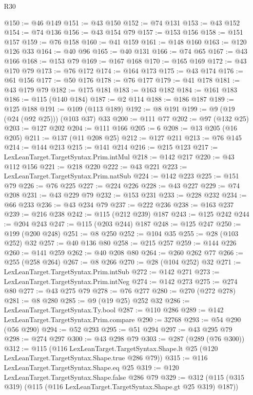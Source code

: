 \begin{lexlean}{R30}
\begin{coremodule}
@150 := @46 @149
@151 := @43 @150
@152 := @74 @131
@153 := @43 @152
@154 := @74 @136
@156 := @43 @154 @79
@157 := @153 @156
@158 := @151 @157
@159 := @76 @158
@160 := @41 @159
@161 := @148 @160
@163 := @120 @126 @33
@164 := @40 @96
@165 := @40 @131
@166 := @74 @65
@167 := @43 @166
@168 := @153 @79
@169 := @167 @168
@170 := @165 @169
@172 := @43 @170 @79
@173 := @76 @172
@174 := @164 @173
@175 := @43 @174
@176 := @61 @156
@177 := @50 @176
@178 := @76 @177
@179 := @41 @178
@181 := @43 @179 @79
@182 := @175 @181
@183 := @163 @182
@184 := @161 @183
@186 := @115 (@140 @184)
@187 := @2 @114
@188 := @186 @187
@189 := @125 @188
@191 := @109 (@113 @189)
@192 := @8 @191
@199 := @9 (@19 (@24 (@92 @25))) (@103 @37) @33
@200 := @111 @77
@202 := @97 (@132 @25)
@203 := @127 @202
@204 := @111 @166
@205 := 6
@208 := @13 @205 (@16 @205)
@211 := @137 (@11 @208 @25)
@212 := @127 @211
@213 := @76 @145
@214 := @144 @213
@215 := @141 @214
@216 := @215 @123
@217 := LexLeanTarget.TargetSyntax.Prim.intMul
@218 := @142 @217
@220 := @43 @112 @156
@221 := @218 @220
@222 := @43 @221
@223 := LexLeanTarget.TargetSyntax.Prim.natSub
@224 := @142 @223
@225 := @151 @79
@226 := @76 @225
@227 := @224 @226
@228 := @43 @227
@229 := @74 @208
@231 := @43 @229 @79
@232 := @153 @231
@233 := @228 @232
@234 := @66 @233
@236 := @43 @234 @79
@237 := @222 @236
@238 := @163 @237
@239 := @216 @238
@242 := @115 (@212 @239) @187
@243 := @125 @242
@244 := @204 @243
@247 := @115 (@203 @244) @187
@248 := @125 @247
@250 := @199 (@200 @248)
@251 := @8 @250
@252 := @104 @35
@255 := @28 (@103 @252) @32
@257 := @40 @136 @80
@258 := @215 @257
@259 := @144 @226
@260 := @141 @259
@262 := @40 @208 @80
@264 := @260 @262 @77
@266 := @255 (@258 @264)
@267 := @8 @266
@270 := @28 (@104 @252) @32
@271 := LexLeanTarget.TargetSyntax.Prim.intSub
@272 := @142 @271
@273 := LexLeanTarget.TargetSyntax.Prim.intNeg
@274 := @142 @273
@275 := @274 @80
@277 := @43 @275 @79
@278 := @76 @277
@280 := @270 (@272 @278)
@281 := @8 @280
@285 := @9 (@19 @25) @252 @32
@286 := LexLeanTarget.TargetSyntax.Ty.bool
@287 := @110 @286
@289 := @142 LexLeanTarget.TargetSyntax.Prim.compare
@290 := 32768
@293 := @54 @290 (@56 @290)
@294 := @52 @293
@295 := @51 @294
@297 := @43 @295 @79
@298 := @274 @297
@300 := @43 @298 @79
@303 := @287 (@289 (@76 @300))
@312 := @115
    (@116
      LexLeanTarget.TargetSyntax.Shape.lt
      @25
      (@120 LexLeanTarget.TargetSyntax.Shape.true @286 @79))
@315 := @116 LexLeanTarget.TargetSyntax.Shape.eq @25
@319 := @120 LexLeanTarget.TargetSyntax.Shape.false @286 @79
@329 := @312 (@115 (@315 @319) (@115 (@116 LexLeanTarget.TargetSyntax.Shape.gt @25 @319) @187))

\end{coremodule}
\end{lexlean}
